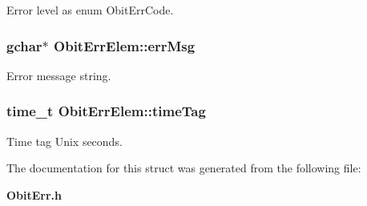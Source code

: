 Error level as enum Obit\-Err\-Code. 

\subsubsection{\setlength{\rightskip}{0pt plus 5cm}gchar$\ast$ {\bf Obit\-Err\-Elem::err\-Msg}}\label{structObitErrElem_o1}


Error message string. 

\subsubsection{\setlength{\rightskip}{0pt plus 5cm}time\_\-t {\bf Obit\-Err\-Elem::time\-Tag}}\label{structObitErrElem_o2}


Time tag Unix seconds. 



The documentation for this struct was generated from the following file:\begin{CompactItemize}
\item 
{\bf Obit\-Err.h}\end{CompactItemize}
